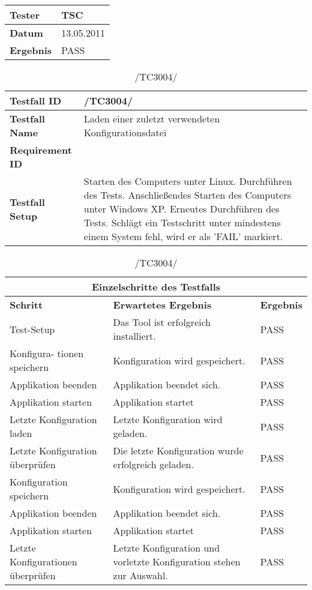 \begin{table}[h]
\begin{center}
\begin{tabular}{|p{3.5cm}|p{11cm}|}
\textbf{Tester} & TSC\\
\hline
\textbf{Datum} & 13.05.2011\\
\hline
\textbf{Ergebnis} & PASS\\
\hline
\end{tabular}
\end{center}
\label{default}
\end{table}

\begin{table}[h]
\caption{/TC3004/}
\label{tab:TC3004}
\begin{center}
\begin{tabular}{|p{3.5cm}|p{11cm}|}
\hline
\textbf{Testfall ID} & /TC3004/\\
\hline
\textbf{Testfall Name} & Laden einer zuletzt verwendeten Konfigurationsdatei \\
\hline
\textbf{Requirement ID} & \\
\hline
\textbf{Testfall Setup} & Starten des Computers unter Linux. Durchführen des Tests.
Anschließendes Starten des Computers unter Windows XP. Erneutes Durchführen des Tests. Schlägt ein Testschritt unter mindestens einem System fehl, wird er als 'FAIL' markiert.\\
\hline
\end{tabular}
\begin{tabular}{|p{4cm}|p{7.8cm}|p{2.3cm}|}
\multicolumn{3}{|c|}{\textbf{Einzelschritte des Testfalls}} \\
\hline
\textbf{Schritt} & \textbf{Erwartetes Ergebnis} & \textbf{Ergebnis}\\
\hline
Test-Setup & Das Tool ist erfolgreich installiert. & PASS\\
\hline
Konfigura- tionen speichern & Konfiguration wird gespeichert. & PASS\\
\hline
Applikation beenden & Applikation beendet sich. & PASS\\
\hline
Applikation starten & Applikation startet & PASS\\
\hline
Letzte Konfiguration laden & Letzte Konfiguration wird geladen. & PASS\\
\hline
Letzte Konfiguration überprüfen & Die letzte Konfiguration wurde erfolgreich
geladen. & PASS\\
\hline
Konfiguration speichern & Konfiguration wird gespeichert. & PASS\\
\hline
Applikation beenden & Applikation beendet sich. & PASS\\
\hline
Applikation starten & Applikation startet & PASS\\
\hline
Letzte Konfigurationen überprüfen & Letzte Konfiguration und vorletzte
Konfiguration stehen zur Auswahl. & PASS\\
\hline
\end{tabular}


\end{center}
\end{table}
